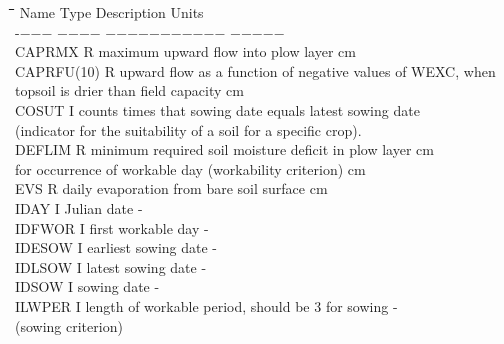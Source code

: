 \begin{tabbing}
\hspace{1.27cm}\=\hspace{1.27cm}\=\hspace{1.27cm}\=\hspace{1.27cm}\=%
\hspace{1.27cm}\=\hspace{1.27cm}\=\hspace{1.27cm}\=\hspace{1.27cm}\=%
\hspace{1.27cm}\=\hspace{1.27cm}\=\kill
Name    \> \> Type   \> Description                                        \> \> \> \> \> \> \> Units\\
-$-$$-$$-$    \> \> $-$$-$$-$$-$   \> $-$$-$$-$$-$$-$$-$$-$$-$$-$$-$$-$                                       \> \> \> \> \> \> \> $-$$-$$-$$-$$-$\\
CAPRMX     \> \> R\> maximum upward flow into plow layer\> \> \> \> \> \> \> cm \\
CAPRFU(10) \> \> R\> upward flow as a function of negative values of WEXC, when\\
\>\> \> topsoil is drier than field capacity\> \> \> \> \> \> \> cm \\
COSUT      \> \> I\> counts times that sowing date equals latest sowing date\\
\>\> \> (indicator for the suitability of a soil for a specific crop).\\
DEFLIM     \> \> R\> minimum required soil moisture deficit in plow layer\> \> \> \> \> \> \> cm\\
          \>\> \> for occurrence of workable day (workability criterion)\> \> \> \> \> \> \> cm\\
EVS\> \> R\> daily evaporation from bare soil surface\> \> \> \> \> \> \> cm\\
IDAY\> \> I\> Julian date\> \> \> \> \> \> \> -\\
IDFWOR\> \> I\> first workable day\> \> \> \> \> \> \> -\\
IDESOW\> \> I\> earliest sowing date\> \> \> \> \> \> \> -\\
IDLSOW\> \> I\> latest sowing date\> \> \> \> \> \> \> -\\
IDSOW\> \> I\> sowing date\> \> \> \> \> \> \> -\\
ILWPER\> \> I\> length of workable period, should be 3 for sowing\> \> \> \> \> \> \> -\\
\>\> \> (sowing criterion)\\
$$
\end{tabbing}
